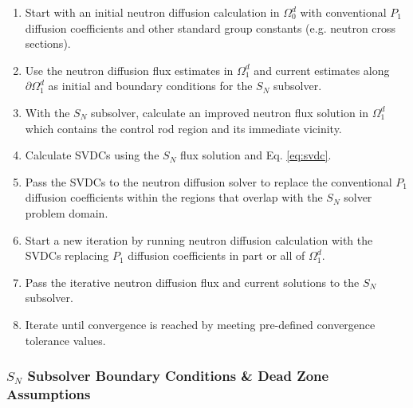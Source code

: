 \begin{enumerate}
  \item Start with an initial neutron diffusion calculation in $\Omega^d_0$ with conventional $P_1$
    diffusion coefficients and other standard group constants (e.g. neutron cross sections).
  \item Use the neutron diffusion flux estimates in $\Omega^d_1$ and current estimates along
    $\partial \Omega^d_1$ as initial and boundary conditions for the $S_N$ subsolver.
  \item With the $S_N$ subsolver, calculate an improved neutron flux solution in $\Omega^d_1$ which
    contains the control rod region and its immediate vicinity.
  \item Calculate \glspl{SVDC} using the $S_N$ flux solution and Eq. \ref{eq:svdc}.
  \item Pass the \glspl{SVDC} to the neutron diffusion solver to replace the conventional
    $P_1$ diffusion coefficients within the regions that overlap with the $S_N$ solver problem
    domain.
  \item Start a new iteration by running neutron diffusion calculation with the \glspl{SVDC}
    replacing $P_1$ diffusion coefficients in part or all of $\Omega^d_1$.
  \item Pass the iterative neutron diffusion flux and current solutions to the $S_N$ subsolver.
  \item Iterate until convergence is reached by meeting pre-defined convergence tolerance values.
\end{enumerate}

\subsubsection{$S_N$ Subsolver Boundary Conditions \& Dead Zone Assumptions}

